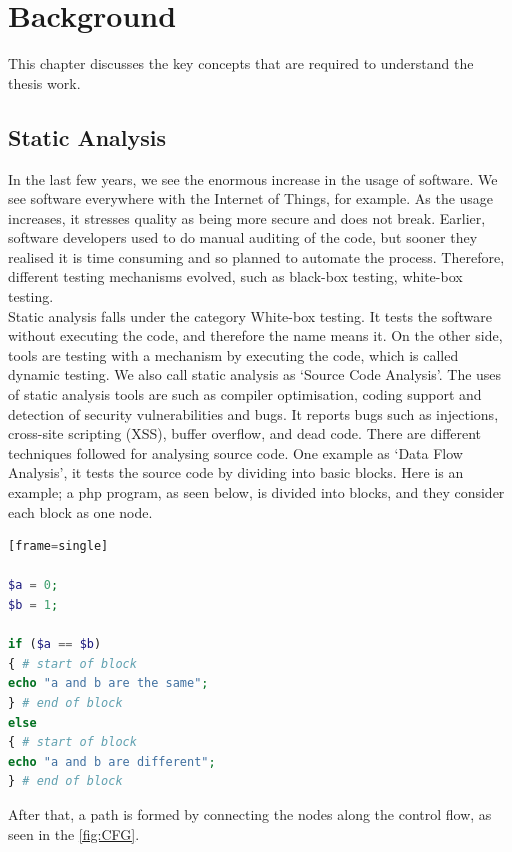 \chapter{Background}
\label{ch:background_report}

This chapter discusses the key concepts that are required to understand the thesis work.

\section{Static Analysis}

In the last few years, we see the enormous increase in the usage of software. We see software everywhere with the Internet of Things, for example. As the usage increases, it stresses quality as being more secure and does not break. Earlier, software developers used to do manual auditing of the code, but sooner they realised it is time consuming and so planned to automate the process. Therefore, different testing mechanisms evolved, such as black-box testing, white-box testing. \\

Static analysis falls under the category White-box testing. It tests the software without executing the code, and therefore the name means it. On the other side, tools are testing with a mechanism by executing the code, which is called dynamic testing. We also call static analysis as ‘Source Code Analysis’. The uses of static analysis tools are such as compiler optimisation, coding support and detection of security vulnerabilities and bugs. \cite{deca} It reports bugs such as injections, cross-site scripting (XSS), buffer overflow, and dead code. \cite{bugs} There are different techniques followed for analysing source code. One example as ‘Data Flow Analysis’, it tests the source code by dividing into basic blocks. \cite{Woegerer} Here is an example; a php program, as seen below, is divided into blocks, and they consider each block as one node.

\begin{lstlisting}[showstringspaces=false, language=PHP][frame=single]

$a = 0;
$b = 1;

if ($a == $b)
{ # start of block
echo "a and b are the same";
} # end of block
else
{ # start of block
echo "a and b are different";
} # end of block


\end{lstlisting}

After that, a path is formed by connecting the nodes along the control flow, as seen in the  \autoref{fig:CFG}. \\

